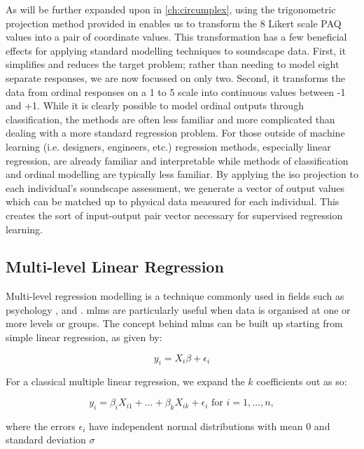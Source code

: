 As will be further expanded upon in \autoref{ch:circumplex}, using the trigonometric projection method provided in \citet{ISO12913Part3} enables us to transform the 8 Likert scale PAQ values into a pair of coordinate values. This transformation has a few beneficial effects for applying standard modelling techniques to soundscape data. First, it simplifies and reduces the target problem; rather than needing to model eight separate responses, we are now focussed on only two. Second, it transforms the data from ordinal responses on a 1 to 5 scale into continuous values between -1 and +1. While it is clearly possible to model ordinal outputs through classification, the methods are often less familiar and more complicated than dealing with a more standard regression problem. For those outside of machine learning (i.e. designers, engineers, etc.) regression methods, especially linear regression, are already familiar and interpretable while methods of classification and ordinal modelling are typically less familiar. By applying the \gls{iso} projection to each individual's soundscape assessment, we generate a vector of output values which can be matched up to physical data measured for each individual. This creates the sort of input-output pair vector necessary for supervised regression learning.

\subsection{Multi-level Linear Regression}

Multi-level regression modelling is a technique commonly used in fields such as psychology , and . \gls{mlm}s are particularly useful when data is organised at one or more levels or groups. The concept behind \gls{mlm}s can be built up starting from simple linear regression, as given by:

\begin{equation}
  y_i = X_i\beta + \epsilon_i
\end{equation}

For a classical multiple linear regression, we expand the $k$ coefficients out as so:

\begin{equation}
  y_i = \beta_i X_{i1} + \ldots + \beta_k X_{ik} + \epsilon_i \text{ for } i = 1, \ldots, n,
\end{equation}

where the errors $\epsilon_i$ have independent normal distributions with mean 0 and standard deviation $\sigma$

